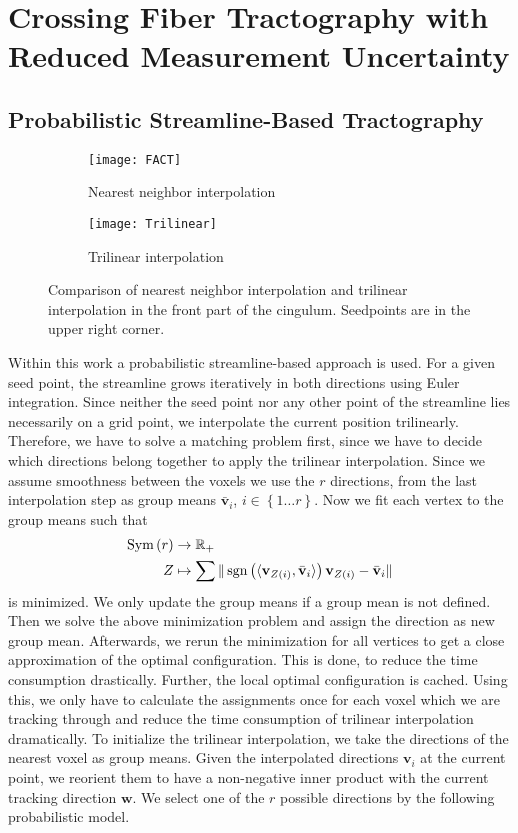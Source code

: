 \section{Crossing Fiber Tractography with Reduced Measurement Uncertainty}

\subsection{Probabilistic Streamline-Based Tractography}
\begin{figure*}[h]
	\centering
	\begin{subfigure}[b]{0.45\linewidth}
		\texttt{[image: FACT]}
		\caption{Nearest neighbor interpolation}
	\end{subfigure}
	\begin{subfigure}[b]{0.45\linewidth}
		\texttt{[image: Trilinear]}
		\caption{Trilinear interpolation}
	\end{subfigure}
	\caption{Comparison of nearest neighbor interpolation and trilinear
	interpolation in the front part of the cingulum. Seedpoints are in the
upper right corner.}

	\label{fig:interpolation-comparison}
\end{figure*}
Within this work a probabilistic streamline-based approach is used. For a given
seed point, the streamline grows iteratively in both directions using Euler
integration. Since neither the seed point nor any other point of the streamline
lies necessarily on a grid point, we interpolate the current position trilinearly. Therefore,
we have to solve a matching problem first, since we have to decide which
directions belong together to apply the trilinear interpolation. Since we assume
smoothness between the voxels we use the $r$ directions, from the last
interpolation step as group means $\bar{\mathbf{v}}_i$, $i \in \left\{ 1\dots r 
\right\}$. Now we fit each vertex to the group means such
that 
\begin{align}
	\text{Sym} \left( r  \right) & \rightarrow \mathbb{R}_+ \\ 
	Z & \mapsto \sum \| \operatorname*{sgn} \left( \langle \mathbf{v}_{Z \left( i \right)}
	, \bar{\mathbf{v}}_i \rangle  \right) \mathbf{v}_{Z \left( i \right)} -
\bar{\mathbf{v}}_i
	\|
\end{align}
is minimized. We only update the group means if a group mean is not defined.
Then we solve the above minimization problem and assign the direction as new
group mean. Afterwards, we rerun the minimization for all vertices to get a
close approximation of the optimal configuration. This is done,
to reduce the time consumption drastically. Further, the local optimal
configuration is cached. Using this, we only have to calculate the assignments
once for each voxel which we are tracking through and reduce the time
consumption of trilinear interpolation dramatically. 
To initialize the trilinear interpolation, we take the directions of the nearest voxel as group means.
Given the interpolated directions $\mathbf{v}_i$ at the current point, we
reorient them to have a non-negative inner product with the current tracking
direction $\mathbf{w}$. We select one of the $r$ possible directions by the
following probabilistic model.

